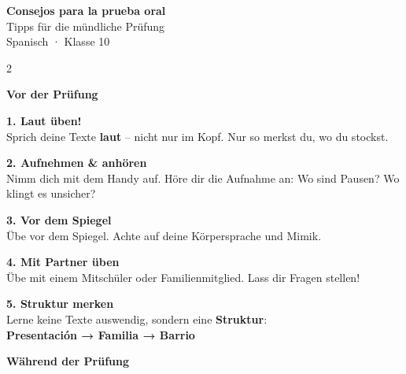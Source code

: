 \documentclass[11pt, a4paper]{article}
\newcommand{\seriftext}[1]{{\fontfamily{ppl}\selectfont #1}}
\newcommand{\es}[1]{\seriftext{\textbf{#1}}}
\newcommand{\tipp}[1]{\textcolor{spanischrot}{\textbf{#1}}}
\begin{document}
\begin{center}
    {\LARGE\bfseries Consejos para la prueba oral}\\[4pt]
    {\large Tipps für die mündliche Prüfung}\\[6pt]
    {\small Spanisch · Klasse 10}
\end{center}

\vspace{8pt}


\begin{multicols}{2}

\textbf{\large Vor der Prüfung}

\begin{tippbox}
\tipp{1. Laut üben!}\\[2pt]
Sprich deine Texte \textbf{laut} -- nicht nur im Kopf. Nur so merkst du, wo du stockst.
\end{tippbox}

\begin{tippbox}
\tipp{2. Aufnehmen \& anhören}\\[2pt]
Nimm dich mit dem Handy auf. Höre dir die Aufnahme an: Wo sind Pausen? Wo klingt es unsicher?
\end{tippbox}

\begin{tippbox}
\tipp{3. Vor dem Spiegel}\\[2pt]
Übe vor dem Spiegel. Achte auf deine Körpersprache und Mimik.
\end{tippbox}

\begin{tippbox}
\tipp{4. Mit Partner üben}\\[2pt]
Übe mit einem Mitschüler oder Familienmitglied. Lass dir Fragen stellen!
\end{tippbox}

\begin{tippbox}
\tipp{5. Struktur merken}\\[2pt]
Lerne keine Texte auswendig, sondern eine \textbf{Struktur}:\\
\es{Presentación → Familia → Barrio}
\end{tippbox}

\columnbreak

\textbf{\large Während der Prüfung}


\end{multicols}
\end{document}
